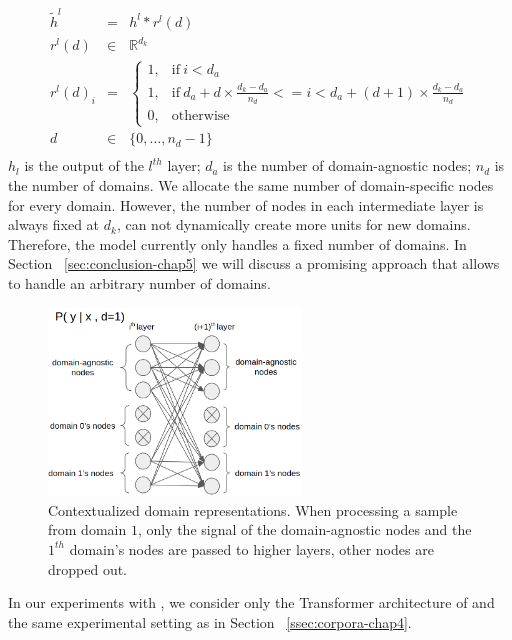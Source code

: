 \begin{equation}
\begin{array}{rcl}
\tilde{h}^{l} &=& h^{l} * r^{l}(d) \\
r^{l}(d) & \in & \mathbb{R}^{d_k} \\
r^{l}(d)_i &=& \begin{cases}
      1, & \text{if}\ i<d_a \\
      1, & \text{if}\ d_a + d \times \frac{d_k - d_a}{n_d} <= i < d_a + (d+1) \times \frac{d_k - d_a}{n_d} \\
      0, & \text{otherwise}
    \end{cases} \\
d & \in & \{0,\dots,n_d-1 \} \\
\end{array}
\label{eq:sparse-chap5}
\end{equation}
$h_l$ is the output of the $l^{th}$ layer; $d_a$ is the number of domain-agnostic nodes; $n_d$ is the number of domains. We allocate the same number of domain-specific nodes for every domain. However, the number of nodes in each intermediate layer is always fixed at $d_k$,  can not dynamically create more units for new domains. Therefore, the model currently only handles a fixed number of domains. In Section ~\ref{sec:conclusion-chap5} we will discuss a promising approach that allows  to handle an arbitrary number of domains.

\begin{figure}[h!]
  \center
  \includegraphics[width=0.6\textwidth]{graphics/Sparse_layers}
  \caption{Contextualized domain representations. When processing a sample from domain $1$, only the signal of the domain-agnostic nodes and the $1^{th}$ domain's nodes are passed to higher layers, other nodes are dropped out.} 
  \label{fig:sparse-chap5}
\end{figure}
In our experiments with , we consider only the Transformer architecture of \citet{Vaswani17attention} and the same experimental setting as in Section ~\ref{ssec:corpora-chap4}.

